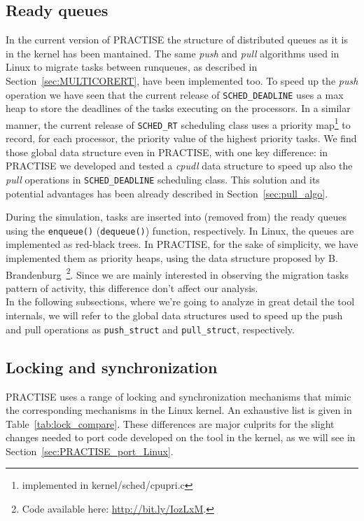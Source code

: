\subsection{Ready queues\label{PRACTISE_ready_queues}}
In the current version of PRACTISE the structure of distributed queues as it is in the kernel
has been mantained. The same \emph{push} and \emph{pull} algorithms used in Linux to
migrate tasks between runqueues, as described in Section~\ref{sec:MULTICORERT}, have been implemented too. 
To speed up the \emph{push} operation we have seen that the current release of \texttt{SCHED\_DEADLINE}
uses a max heap to store the deadlines of the tasks executing on the processors. 
In a similar manner, the current release of \texttt{SCHED\_RT} scheduling class uses a priority 
map\footnote{implemented in kernel/sched/cpupri.c} to record, for each processor, the priority 
value of the highest priority tasks. We find those global data structure even in
PRACTISE, with one key difference: in PRACTISE we developed and tested a \emph{cpudl} data
structure to speed up also the \emph{pull} operations in \texttt{SCHED\_DEADLINE} scheduling class. 
This solution and its potential advantages has been already described in Section~\ref{sec:pull_algo}.

During the simulation, tasks are inserted into (removed from) the ready queues using the
\texttt{enqueue()} (\texttt{dequeue()}) function, respectively. In Linux, the queues are implemented
as red-black trees. In PRACTISE, for the sake of simplicity, we have implemented them as priority heaps, 
using the data structure proposed by B. Brandenburg~\footnote{Code available here:
  \url{http://bit.ly/IozLxM}.}. Since we are mainly interested in
observing the migration tasks pattern of activity, this difference don't affect our
analysis.\\
In the following subsections, where we're going to analyze in great detail the tool internals, we will refer
to the global data structures used to speed up the push and pull operations as \texttt{push\_struct}
and \texttt{pull\_struct}, respectively.

\subsection{Locking and synchronization\label{PRACTISE_lock_and_synch}}
PRACTISE uses a range of locking and synchronization mechanisms that mimic the corresponding mechanisms
in the Linux kernel. An exhaustive list is given in Table~\ref{tab:lock_compare}. These differences
are major culprits for the slight changes needed to port code developed on the tool in the kernel, as
we will see in Section~\ref{sec:PRACTISE_port_Linux}.

